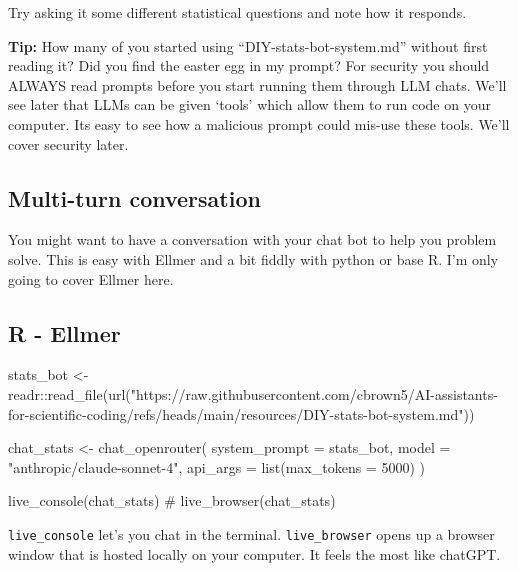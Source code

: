 \documentclass[
  letterpaper,
  DIV=11,
  numbers=noendperiod]{scrreprt}
\newenvironment{Shaded}{\begin{snugshade}}{\end{snugshade}}
\newcommand{\AttributeTok}[1]{\textcolor[rgb]{0.40,0.45,0.13}{#1}}
\newcommand{\CommentTok}[1]{\textcolor[rgb]{0.37,0.37,0.37}{#1}}
\newcommand{\DecValTok}[1]{\textcolor[rgb]{0.68,0.00,0.00}{#1}}
\newcommand{\FunctionTok}[1]{\textcolor[rgb]{0.28,0.35,0.67}{#1}}
\newcommand{\NormalTok}[1]{\textcolor[rgb]{0.00,0.23,0.31}{#1}}
\newcommand{\OtherTok}[1]{\textcolor[rgb]{0.00,0.23,0.31}{#1}}
\newcommand{\SpecialCharTok}[1]{\textcolor[rgb]{0.37,0.37,0.37}{#1}}
\newcommand{\StringTok}[1]{\textcolor[rgb]{0.13,0.47,0.30}{#1}}
\begin{document}
Try asking it some different statistical questions and note how it
responds.

\textbf{Tip:} How many of you started using ``DIY-stats-bot-system.md''
without first reading it? Did you find the easter egg in my prompt? For
security you should ALWAYS read prompts before you start running them
through LLM chats. We'll see later that LLMs can be given `tools' which
allow them to run code on your computer. Its easy to see how a malicious
prompt could mis-use these tools. We'll cover security later.

\subsection{Multi-turn conversation}\label{multi-turn-conversation}

You might want to have a conversation with your chat bot to help you
problem solve. This is easy with Ellmer and a bit fiddly with python or
base R. I'm only going to cover Ellmer here.

\subsection{R - Ellmer}

\begin{Shaded}
\begin{Highlighting}[]
\NormalTok{stats\_bot }\OtherTok{\textless{}{-}}\NormalTok{ readr}\SpecialCharTok{::}\FunctionTok{read\_file}\NormalTok{(}\FunctionTok{url}\NormalTok{(}\StringTok{"https://raw.githubusercontent.com/cbrown5/AI{-}assistants{-}for{-}scientific{-}coding/refs/heads/main/resources/DIY{-}stats{-}bot{-}system.md"}\NormalTok{))}

\NormalTok{chat\_stats }\OtherTok{\textless{}{-}} \FunctionTok{chat\_openrouter}\NormalTok{(}
  \AttributeTok{system\_prompt =}\NormalTok{ stats\_bot,}
  \AttributeTok{model =} \StringTok{"anthropic/claude{-}sonnet{-}4"}\NormalTok{,}
  \AttributeTok{api\_args =} \FunctionTok{list}\NormalTok{(}\AttributeTok{max\_tokens =} \DecValTok{5000}\NormalTok{)}
\NormalTok{)}

\FunctionTok{live\_console}\NormalTok{(chat\_stats)}
\CommentTok{\# live\_browser(chat\_stats)}
\end{Highlighting}
\end{Shaded}

\texttt{live\_console} let's you chat in the terminal.
\texttt{live\_browser} opens up a browser window that is hosted locally
on your computer. It feels the most like chatGPT.
\end{document}
